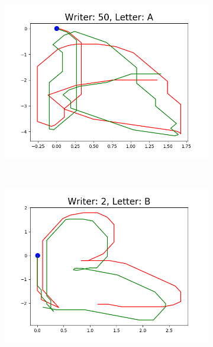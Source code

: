   \begin{figure}
  \centering
      \begin{subfigure}[b]{0.17\textwidth}
          \includegraphics[width=\textwidth]{images/framework/comparison_figures/A_50.png}
      \end{subfigure}
      ~ %
      \begin{subfigure}[b]{0.17\textwidth}
          \includegraphics[width=\textwidth]{images/framework/comparison_figures/B_2.png}
      \end{subfigure}
      ~
      \begin{subfigure}[b]{0.17\textwidth}

\end{subfigure}
\end{figure}
